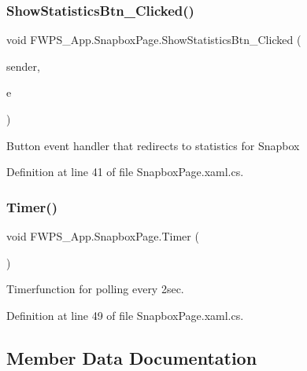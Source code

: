 \subsubsection{\texorpdfstring{Show\+Statistics\+Btn\+\_\+\+Clicked()}{ShowStatisticsBtn\_Clicked()}}
{\footnotesize\ttfamily void F\+W\+P\+S\+\_\+\+App.\+Snapbox\+Page.\+Show\+Statistics\+Btn\+\_\+\+Clicked (\begin{DoxyParamCaption}\item[{object}]{sender,  }\item[{Event\+Args}]{e }\end{DoxyParamCaption})\hspace{0.3cm}{\ttfamily [private]}}

Button event handler that redirects to statistics for Snapbox 

Definition at line 41 of file Snapbox\+Page.\+xaml.\+cs.

\mbox{\label{class_f_w_p_s___app_1_1_snapbox_page_adaab2a50e9ce885bcc53760f312e5b6c}} 
\subsubsection{\texorpdfstring{Timer()}{Timer()}}
{\footnotesize\ttfamily void F\+W\+P\+S\+\_\+\+App.\+Snapbox\+Page.\+Timer (\begin{DoxyParamCaption}{ }\end{DoxyParamCaption})\hspace{0.3cm}{\ttfamily [private]}}



Timerfunction for polling every 2sec. 



Definition at line 49 of file Snapbox\+Page.\+xaml.\+cs.



\subsection{Member Data Documentation}
\mbox{\label{class_f_w_p_s___app_1_1_snapbox_page_a627ce04dbed30c4dabc8333f99114f06}} 
